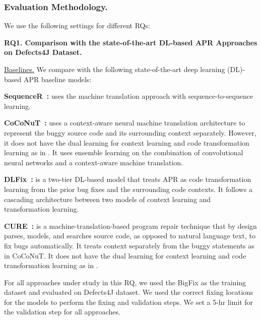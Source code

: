 \subsubsection{Evaluation Methodology.}
We use the following settings for different RQs:

{\bf RQ1. Comparison with the state-of-the-art DL-based APR Approaches on
  Defects4J Dataset.}

\underline{Baselines.} We compare {\tool} with the following
state-of-the-art deep learning (DL)-based APR baseline models:



{\bf SequenceR~\cite{chen2018sequencer}: } uses the machine
translation approach with sequence-to-sequence learning.

{\bf CoCoNuT~\cite{lutellier2020coconut}:} uses a context-aware neural
machine translation architecture to represent the buggy source code
and its surrounding context separately. However, it does not have the
dual learning for context learning and code transformation learning as
in {\tool}. It uses ensemble learning on the combination of
convolutional neural networks and a context-aware machine translation.

{\bf DLFix~\cite{li2020dlfix}: } is a two-tier DL-based model that
treats APR as code transformation learning from the prior bug fixes
and the surrounding code contexts. It follows a cascading architecture
between two models of context learning and transformation learning.

{\bf CURE~\cite{cure-icse21}: } is a machine-translation-based program repair
technique that by design parses, models, and searches source code, as
opposed to natural language text, to fix bugs automatically. It treats
context separately from the buggy statements as in CoCoNuT. It does
not have the dual learning for context learning and code
transformation learning as in {\tool}.



For all approaches under study in this RQ, we used the BigFix as the
training dataset and evaluated on Defects4J dataset. 
We used the correct fixing locations for the models to perform the fixing and validation steps. We set a 5-hr limit for the validation step for all approaches. 


